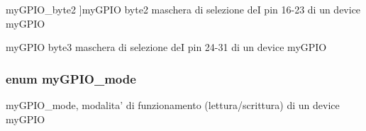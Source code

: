 \begin{Desc}
\begin{description}
{\hypertarget{group__my_g_p_i_o_gga402a0d20afc0cb7c25554b8b023f4253af4892f7db28c64a7cf2a7236c88b742b}{my\+G\+P\+I\+O\+\_\+byte2}\label{group__my_g_p_i_o_gga402a0d20afc0cb7c25554b8b023f4253af4892f7db28c64a7cf2a7236c88b742b}
}]my\+G\+P\+I\+O byte2 maschera di selezione de\+I pin 16-\/23 di un device my\+G\+P\+I\+O \item[{\em 
\hypertarget{group__my_g_p_i_o_gga402a0d20afc0cb7c25554b8b023f4253a1ceefb9d65397352e986c573984d0129}{my\+G\+P\+I\+O\+\_\+byte3}\label{group__my_g_p_i_o_gga402a0d20afc0cb7c25554b8b023f4253a1ceefb9d65397352e986c573984d0129}
}]my\+G\+P\+I\+O byte3 maschera di selezione de\+I pin 24-\/31 di un device my\+G\+P\+I\+O \end{description}
\end{Desc}
\hypertarget{group__my_g_p_i_o_ga76b849f0e0c05e7f9161bdb33396f2b1}{
\subsubsection[{my\+G\+P\+I\+O\+\_\+mode}]{\setlength{\rightskip}{0pt plus 5cm}enum {\bf my\+G\+P\+I\+O\+\_\+mode}}}\label{group__my_g_p_i_o_ga76b849f0e0c05e7f9161bdb33396f2b1}


my\+G\+P\+I\+O\+\_\+mode, modalita' di funzionamento (lettura/scrittura) di un device my\+G\+P\+I\+O 

